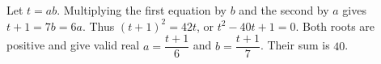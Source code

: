 Let $t=ab$. Multiplying the first equation by $b$ and the second by $a$ gives $t+1=7b=6a$. Thus $(t+1)^2=42t$, or $t^2-40t+1=0$. Both roots are positive and give valid real $a=\dfrac{t+1}{6}$ and $b=\dfrac{t+1}{7}$. Their sum is $\boxed{40}$.
